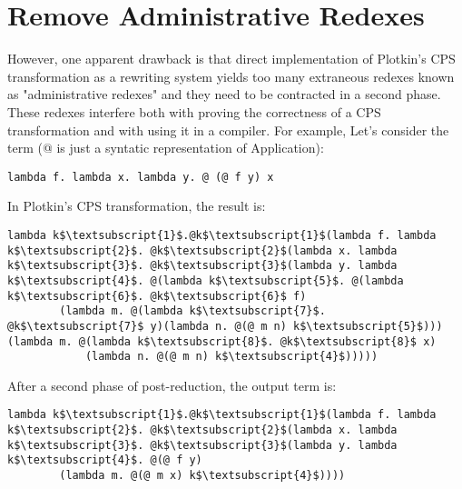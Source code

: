 \section{Remove Administrative Redexes}

However, one apparent drawback is that direct implementation of Plotkin's CPS transformation as a rewriting system yields too many extraneous redexes known as "administrative redexes" and they need to be contracted in a second phase. These redexes interfere both with proving the correctness of a CPS transformation and with using it in a compiler. For example, Let's consider the term (@ is just a syntatic representation of Application):
\begin{lstlisting}[language=Lambda]
	lambda f. lambda x. lambda y. @ (@ f y) x
\end{lstlisting}

In Plotkin's CPS transformation, the result is:

\begin{lstlisting}[language=Lambda]
	lambda k$\textsubscript{1}$.@k$\textsubscript{1}$(lambda f. lambda k$\textsubscript{2}$. @k$\textsubscript{2}$(lambda x. lambda k$\textsubscript{3}$. @k$\textsubscript{3}$(lambda y. lambda k$\textsubscript{4}$. @(lambda k$\textsubscript{5}$. @(lambda k$\textsubscript{6}$. @k$\textsubscript{6}$ f)
		(lambda m. @(lambda k$\textsubscript{7}$. @k$\textsubscript{7}$ y)(lambda n. @(@ m n) k$\textsubscript{5}$))) (lambda m. @(lambda k$\textsubscript{8}$. @k$\textsubscript{8}$ x)
			(lambda n. @(@ m n) k$\textsubscript{4}$)))))
\end{lstlisting}
After a second phase of post-reduction, the output term is:

\begin{lstlisting}[language=Lambda]
	lambda k$\textsubscript{1}$.@k$\textsubscript{1}$(lambda f. lambda k$\textsubscript{2}$. @k$\textsubscript{2}$(lambda x. lambda k$\textsubscript{3}$. @k$\textsubscript{3}$(lambda y. lambda k$\textsubscript{4}$. @(@ f y)
		(lambda m. @(@ m x) k$\textsubscript{4}$))))
\end{lstlisting}

